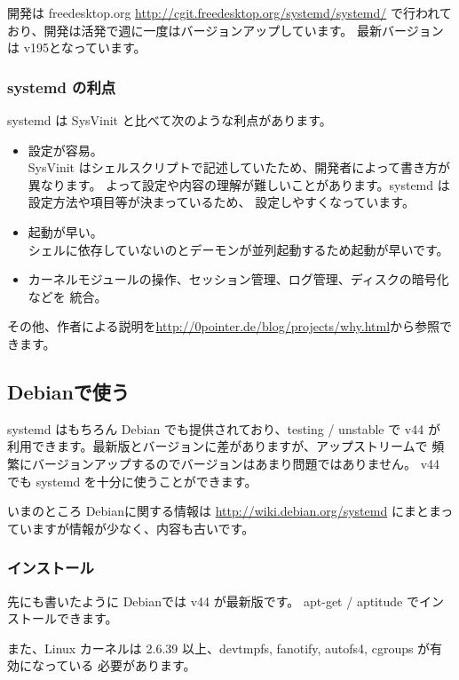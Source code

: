 \documentclass[mingoth,a4paper]{jsarticle}
\begin{document}
開発は freedesktop.org
\url{http://cgit.freedesktop.org/systemd/systemd/}
で行われており、開発は活発で週に一度はバージョンアップしています。
最新バージョンは v195となっています。

\subsubsection{systemd の利点}
systemd は SysVinit と比べて次のような利点があります。

\begin{itemize}
\item 設定が容易。\\
SysVinit はシェルスクリプトで記述していたため、開発者によって書き方が異なります。
よって設定や内容の理解が難しいことがあります。systemd は設定方法や項目等が決まっているため、
設定しやすくなっています。

\item 起動が早い。 \\
シェルに依存していないのとデーモンが並列起動するため起動が早いです。

\item カーネルモジュールの操作、セッション管理、ログ管理、ディスクの暗号化などを
統合。

\end{itemize}

その他、作者による説明を\url{http://0pointer.de/blog/projects/why.html}から参照できます。

\subsection{Debianで使う}

systemd はもちろん Debian でも提供されており、testing / unstable で v44 が
利用できます。最新版とバージョンに差がありますが、アップストリームで
頻繁にバージョンアップするのでバージョンはあまり問題ではありません。
v44 でも systemd を十分に使うことができます。

いまのところ Debianに関する情報は \url{http://wiki.debian.org/systemd}
にまとまっていますが情報が少なく、内容も古いです。

\subsubsection{インストール}
先にも書いたように Debianでは v44 が最新版です。
apt-get / aptitude でインストールできます。

また、Linux カーネルは 2.6.39 以上、devtmpfs, fanotify, autofs4, cgroups が有効になっている
必要があります。
\end{document}
